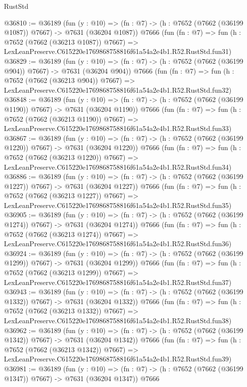 \begin{lexlean}{RustStd}
\begin{coremodule}
@36810 := @36189
    (fun (y : @10) => (fn : @7) -> (h : @7652 (@7662 (@36199 @1087)) @7667) -> @7631 (@36204 @1087))
    @7666
    (fun (fn : @7) =>
    fun (h : @7652 (@7662 (@36213 @1087)) @7667) =>
    LexLeanPreserve.C615220e1769868758816f61a54a2e4b1.R52.RustStd.fun31)
@36829 := @36189
    (fun (y : @10) => (fn : @7) -> (h : @7652 (@7662 (@36199 @904)) @7667) -> @7631 (@36204 @904))
    @7666
    (fun (fn : @7) =>
    fun (h : @7652 (@7662 (@36213 @904)) @7667) =>
    LexLeanPreserve.C615220e1769868758816f61a54a2e4b1.R52.RustStd.fun32)
@36848 := @36189
    (fun (y : @10) => (fn : @7) -> (h : @7652 (@7662 (@36199 @1190)) @7667) -> @7631 (@36204 @1190))
    @7666
    (fun (fn : @7) =>
    fun (h : @7652 (@7662 (@36213 @1190)) @7667) =>
    LexLeanPreserve.C615220e1769868758816f61a54a2e4b1.R52.RustStd.fun33)
@36867 := @36189
    (fun (y : @10) => (fn : @7) -> (h : @7652 (@7662 (@36199 @1220)) @7667) -> @7631 (@36204 @1220))
    @7666
    (fun (fn : @7) =>
    fun (h : @7652 (@7662 (@36213 @1220)) @7667) =>
    LexLeanPreserve.C615220e1769868758816f61a54a2e4b1.R52.RustStd.fun34)
@36886 := @36189
    (fun (y : @10) => (fn : @7) -> (h : @7652 (@7662 (@36199 @1227)) @7667) -> @7631 (@36204 @1227))
    @7666
    (fun (fn : @7) =>
    fun (h : @7652 (@7662 (@36213 @1227)) @7667) =>
    LexLeanPreserve.C615220e1769868758816f61a54a2e4b1.R52.RustStd.fun35)
@36905 := @36189
    (fun (y : @10) => (fn : @7) -> (h : @7652 (@7662 (@36199 @1274)) @7667) -> @7631 (@36204 @1274))
    @7666
    (fun (fn : @7) =>
    fun (h : @7652 (@7662 (@36213 @1274)) @7667) =>
    LexLeanPreserve.C615220e1769868758816f61a54a2e4b1.R52.RustStd.fun36)
@36924 := @36189
    (fun (y : @10) => (fn : @7) -> (h : @7652 (@7662 (@36199 @1299)) @7667) -> @7631 (@36204 @1299))
    @7666
    (fun (fn : @7) =>
    fun (h : @7652 (@7662 (@36213 @1299)) @7667) =>
    LexLeanPreserve.C615220e1769868758816f61a54a2e4b1.R52.RustStd.fun37)
@36943 := @36189
    (fun (y : @10) => (fn : @7) -> (h : @7652 (@7662 (@36199 @1332)) @7667) -> @7631 (@36204 @1332))
    @7666
    (fun (fn : @7) =>
    fun (h : @7652 (@7662 (@36213 @1332)) @7667) =>
    LexLeanPreserve.C615220e1769868758816f61a54a2e4b1.R52.RustStd.fun38)
@36962 := @36189
    (fun (y : @10) => (fn : @7) -> (h : @7652 (@7662 (@36199 @1342)) @7667) -> @7631 (@36204 @1342))
    @7666
    (fun (fn : @7) =>
    fun (h : @7652 (@7662 (@36213 @1342)) @7667) =>
    LexLeanPreserve.C615220e1769868758816f61a54a2e4b1.R52.RustStd.fun39)
@36981 := @36189
    (fun (y : @10) => (fn : @7) -> (h : @7652 (@7662 (@36199 @1347)) @7667) -> @7631 (@36204 @1347))
    @7666

\end{coremodule}
\end{lexlean}
